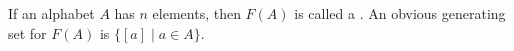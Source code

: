 If an alphabet $A$ has $n$ elements, then $F(A)$ is called a . An obvious generating set for $F(A)$ is $\{[a] \mid a \in A\}$.
